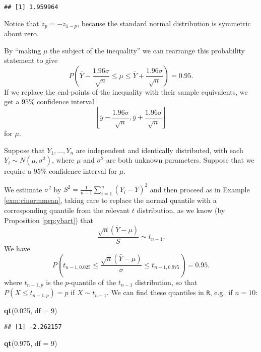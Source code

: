 \documentclass[]{book}
\newenvironment{Shaded}{\begin{snugshade}}{\end{snugshade}}
\newcommand{\KeywordTok}[1]{\textcolor[rgb]{0.13,0.29,0.53}{\textbf{#1}}}
\newcommand{\DataTypeTok}[1]{\textcolor[rgb]{0.13,0.29,0.53}{#1}}
\newcommand{\DecValTok}[1]{\textcolor[rgb]{0.00,0.00,0.81}{#1}}
\newcommand{\FloatTok}[1]{\textcolor[rgb]{0.00,0.00,0.81}{#1}}
\newcommand{\NormalTok}[1]{#1}
\theoremstyle{definition}
\theoremstyle{definition}
\theoremstyle{definition}
\theoremstyle{remark}
\let\BeginKnitrBlock\begin \let\EndKnitrBlock\end
\begin{document}
\begin{verbatim}
## [1] 1.959964
\end{verbatim}

Notice that \(z_{p} = - z_{1 - p}\), because the standard normal
distribution is symmetric about zero.

By ``making \(\mu\) the subject of the inequality'' we can rearrange
this probability statement to give
\[P\left(\bar Y - \frac{1.96 \sigma}{\sqrt{n}} \leq 
\mu \leq \bar Y + \frac{1.96 \sigma}{\sqrt{n}} \right) = 0.95.\] If we
replace the end-points of the inequality with their sample equivalents,
we get a \(95 \%\) confidence interval
\[\left[\bar y - \frac{1.96 \sigma}{\sqrt{n}}, 
\bar y + \frac{1.96 \sigma}{\sqrt{n}} \right]\] for \(\mu\).

\BeginKnitrBlock{example}[Normal mean, unknown variance]
\protect\hypertarget{exm:cinormmeanunknownsigma}{}{\label{exm:cinormmeanunknownsigma}
\iffalse (Normal mean, unknown variance) \fi{} }Suppose that
\(Y_1, \ldots, Y_n\) are independent and identically distributed, with
each \(Y_i \sim N(\mu, \sigma^2)\), where \(\mu\) and \(\sigma^2\) are
both unknown parameters. Suppose that we require a \(95 \%\) confidence
interval for \(\mu\).

We estimate \(\sigma^2\) by
\(S^2 = \frac{1}{n-1} \sum_{i=1}^n (Y_i - \bar Y)^2\) and then proceed
as in Example \ref{exm:cinormmean}, taking care to replace the normal
quantile with a corresponding quantile from the relevant \(t\)
distribution, as we know (by Proposition \ref{prp:ybart}) that
\[\frac{\sqrt{n}(\bar Y - \mu)}{S} \sim t_{n-1}.\] We have
\[P(t_{n-1, 0.025} \leq \frac{\sqrt{n}(\bar Y - \mu)}{\sigma} \leq t_{n-1, 0.975}) = 0.95.\]
where \(t_{n-1, p}\) is the \(p\)-quantile of the \(t_{n-1}\)
distribution, so that \(P(X \leq t_{n-1, p}) = p\) if
\(X \sim t_{n-1}\). We can find these quantiles in \texttt{R}, e.g.~if
\(n = 10\):
\EndKnitrBlock{example}

\begin{Shaded}
\begin{Highlighting}[]
\KeywordTok{qt}\NormalTok{(}\FloatTok{0.025}\NormalTok{, }\DataTypeTok{df =} \DecValTok{9}\NormalTok{)}
\end{Highlighting}
\end{Shaded}

\begin{verbatim}
## [1] -2.262157
\end{verbatim}

\begin{Shaded}
\begin{Highlighting}[]
\KeywordTok{qt}\NormalTok{(}\FloatTok{0.975}\NormalTok{, }\DataTypeTok{df =} \DecValTok{9}\NormalTok{)}
\end{Highlighting}
\end{Shaded}
\end{document}
